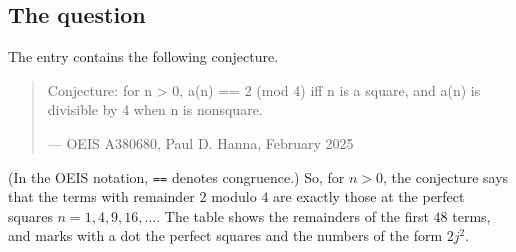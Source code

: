 \documentclass[11pt,a4paper]{article}
\theoremstyle{definition}
\theoremstyle{remark}
\begin{document}
\subsection{The question}
The entry contains the following conjecture.
\begin{quote}\small\ttfamily\raggedright Conjecture: for n > 0, a(n) == 2 (mod 4) iff n is a square, and a(n) is divisible by 4 when n is nonsquare.\par\smallskip\hfill\textrm{--- OEIS A380680, Paul D. Hanna, February 2025}\end{quote}

(In the OEIS notation, \texttt{==} denotes congruence.) So, for $n>0$, the conjecture says that the terms with remainder $2$ modulo $4$ are exactly those at the
perfect squares $n=1,4,9,16,\dots$. The table shows the remainders of the first $48$ terms, and marks with a dot the
perfect squares and the numbers of the form $2j^2$.
\end{document}
